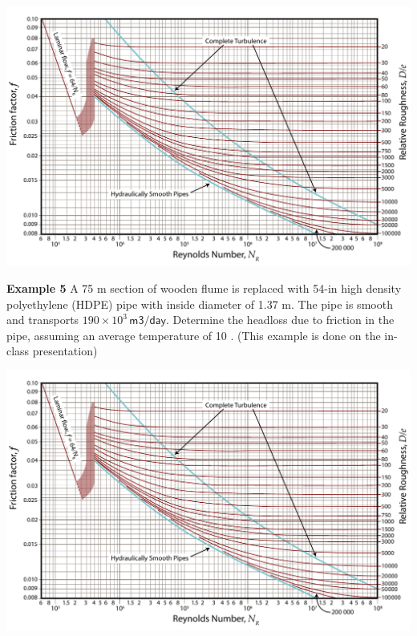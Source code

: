 \documentclass[10pt, onesided]{amsart}
\begin{document}
	\begin{center}
		\includegraphics[scale=1.05, angle=90]{../../figs/05FrictionLosses/moody.pdf}
	\end{center}
	
	
	\newpage
	
	
	\textbf{Example 5}
	A 75 m section of wooden flume is replaced with 54-in high
	density polyethylene (HDPE) pipe with inside diameter of
	1.37 m. The pipe is smooth and transports $ 190 \times 10^3\mathsf{\, m3/day}$.
	Determine the headloss due to friction in the pipe, assuming
	an average temperature of 10 \textcelsius.
	\parb
	(This example is done on the in-class presentation)
	
	\begin{center}
		\includegraphics[scale=1.05, angle=90]{../../figs/05FrictionLosses/moody.pdf}
	\end{center}
	
\end{document}
